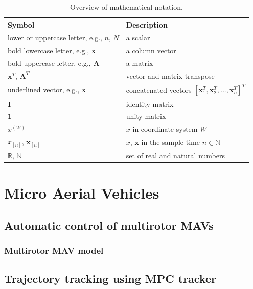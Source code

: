 \documentclass[a4paper,11pt,titlepage,twoside]{book}
\begin{document}
\begin{table}[h]
  \centering
  \begin{tabular}{ll}
    \hline
    Symbol & Description \\
    \hline
    lower or uppercase letter, e.g., $n$, $N$ & a scalar \\
    bold lowercase letter, e.g., \textbf{x} & a column vector \\
    bold uppercase letter, e.g., \textbf{A} & a matrix \\
    $\textbf{x}^T$, $\textbf{A}^T$ & vector and matrix transpose \\
    underlined vector, e.g., \textbf{\underline{x}} & concatenated vectors $\left[\textbf{x}_1^T,\textbf{x}_2^T,...,\textbf{x}_n^T\right]^T$ \\
    \textbf{I} & identity matrix \\
    \textbf{1} & unity matrix \\
    $x^{(W)}$ & $x$ in coordinate system $W$ \\
    $x_{[n]}$, $\textbf{x}_{[n]}$ & $x$, $\textbf{x}$ in the sample time $n \in \mathbb{N}$ \\
    $\mathbb{R}$, $\mathbb{N}$ & set of real and natural numbers \\
    \hline
  \end{tabular}
  \caption{Overview of mathematical notation.}
  \label{tab:notation}
\end{table}


\clearpage


\chapter{Micro Aerial Vehicles}

\section{Automatic control of multirotor MAVs}

\subsection{Multirotor MAV model}

\section{Trajectory tracking using MPC tracker}
\end{document}
